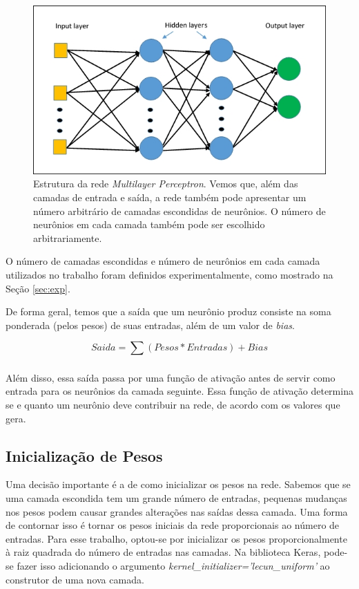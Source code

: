 \documentclass[12pt]{article}
\begin{document}
\begin{figure}[!htbp]
  \centering
  \includegraphics[width=1\textwidth]{mlp.jpg}
  \caption{Estrutura da rede \textit{Multilayer Perceptron}. Vemos
  que, além das camadas de entrada e saída, a rede também pode
  apresentar um número arbitrário de camadas escondidas de neurônios.
  O número de neurônios em cada camada também pode ser escolhido
  arbitrariamente.}
  \label{fig:mlp}
\end{figure}

O número de camadas escondidas e número de neurônios em cada camada
utilizados no trabalho foram definidos experimentalmente, como mostrado
na Seção \ref{sec:exp}.

De forma geral, temos que a saída que um neurônio produz consiste na
soma ponderada (pelos pesos) de suas entradas, além de um valor de
\textit{bias}.

\begin{displaymath}
	Saida = \sum_{} (Pesos * Entradas) + Bias
\end{displaymath}

Além disso, essa saída passa por uma função de ativação antes de 
servir como entrada para os neurônios da camada seguinte. Essa
função de ativação determina se e quanto um neurônio deve contribuir
na rede, de acordo com os valores que gera.

\subsection{Inicialização de Pesos}

Uma decisão importante é a de como inicializar os pesos na rede. Sabemos
que se uma camada escondida tem um grande número de entradas, pequenas
mudanças nos pesos podem causar grandes alterações nas saídas dessa
camada. Uma forma de contornar isso é tornar os pesos iniciais da rede
proporcionais ao número de entradas. Para esse trabalho, optou-se por
inicializar os pesos proporcionalmente à raiz quadrada do número de
entradas nas camadas. Na biblioteca Keras, pode-se fazer isso adicionando
o argumento \textit{kernel\_initializer='lecun\_uniform'} ao construtor
de uma nova camada.
\end{document}
